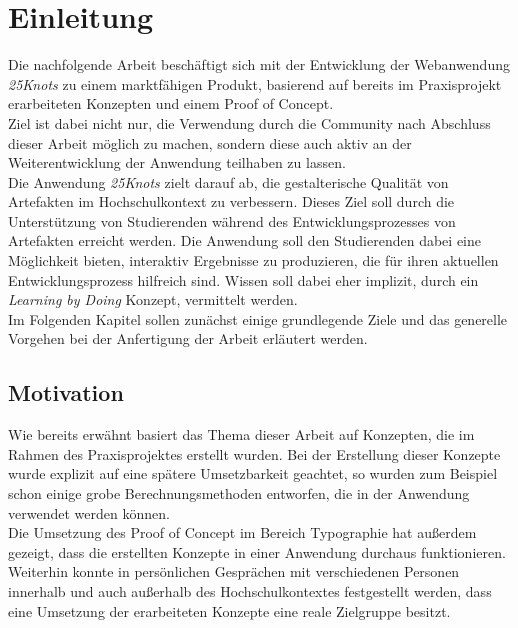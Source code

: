 \chapter{Einleitung}
\thispagestyle{fancy}
Die nachfolgende Arbeit beschäftigt sich mit der Entwicklung der Webanwendung \textit{25Knots} zu einem marktfähigen Produkt, basierend auf bereits im Praxisprojekt erarbeiteten Konzepten und einem Proof of Concept.\\
Ziel ist dabei nicht nur, die Verwendung durch die Community\footnotemark{} nach Abschluss dieser Arbeit möglich zu machen, sondern diese auch aktiv an der Weiterentwicklung der Anwendung teilhaben zu lassen.\\

Die Anwendung \textit{25Knots} zielt darauf ab, die gestalterische Qualität von Artefakten im Hochschulkontext zu verbessern. Dieses Ziel soll durch die Unterstützung von Studierenden während des Entwicklungsprozesses von Artefakten erreicht werden. Die Anwendung soll den Studierenden dabei eine Möglichkeit bieten, interaktiv Ergebnisse zu produzieren, die für ihren aktuellen Entwicklungsprozess hilfreich sind. Wissen soll dabei eher implizit, durch ein \textit{Learning by Doing} Konzept, vermittelt werden.\\

Im Folgenden Kapitel sollen zunächst einige grundlegende Ziele und das generelle Vorgehen bei der Anfertigung der Arbeit erläutert werden.


\section{Motivation}
Wie bereits erwähnt basiert das Thema dieser Arbeit auf Konzepten, die im Rahmen des Praxisprojektes  erstellt wurden. Bei der Erstellung dieser Konzepte wurde explizit auf eine spätere Umsetzbarkeit geachtet, so wurden zum Beispiel schon einige grobe Berechnungsmethoden entworfen, die in der Anwendung verwendet werden können.\\
Die Umsetzung des Proof of Concept im Bereich Typographie hat außerdem gezeigt, dass die erstellten Konzepte in einer Anwendung durchaus funktionieren.\\
Weiterhin konnte in persönlichen Gesprächen mit verschiedenen Personen innerhalb und auch außerhalb des Hochschulkontextes festgestellt werden, dass eine Umsetzung der erarbeiteten Konzepte eine reale Zielgruppe besitzt.\\

